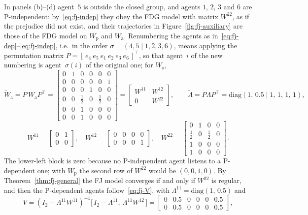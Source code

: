 In panels (b)--(d) agent~$5$ is outside the closed group, and agents $1$, $2$, $3$ and
$6$ are P-independent: by~\eqref{eq:fj-indep} they obey the FDG model with matrix
$W^{22}$, as if the prejudice did not exist, and their trajectories in
Figure~\ref{fig:fj-auxiliary} are those of the FDG model on $W_{\mathrm{p}}$ and
$W_{\mathrm{a}}$. Renumbering the agents as in~\eqref{eq:fj-dep}--\eqref{eq:fj-indep},
i.e.\ in the order $\sigma = (4, 5 \mid 1, 2, 3, 6)$, means applying the permutation
matrix $P = [\, e_4\ e_5\ e_1\ e_2\ e_3\ e_6 \,]^\top$, so that agent~$i$ of the new
numbering is agent~$\sigma(i)$ of the original one; for $W_{\mathrm{a}}$,
\[
  \tilde W_{\mathrm{a}} = P\, W_{\mathrm{a}} P^\top =
  \left[\begin{array}{cc|cccc}
    0 & 1 & 0 & 0 & 0 & 0\\
    0 & 0 & 0 & 0 & 0 & 1\\ \hline
    0 & 0 & 0 & 1 & 0 & 0\\
    0 & 0 & \tfrac12 & 0 & \tfrac12 & 0\\
    0 & 0 & 1 & 0 & 0 & 0\\
    0 & 0 & 1 & 0 & 0 & 0
  \end{array}\right]
  = \begin{bmatrix} W^{11} & W^{12} \\ 0 & W^{22} \end{bmatrix},
  \qquad
  \tilde\Lambda = P \Lambda P^\top = \mathrm{diag}(1,\, 0.5 \mid 1,\, 1,\, 1,\, 1),
\]
\[
  W^{11} = \begin{bmatrix} 0&1\\ 0&0 \end{bmatrix},\quad
  W^{12} = \begin{bmatrix} 0&0&0&0\\ 0&0&0&1 \end{bmatrix},\quad
  W^{22} = \begin{bmatrix} 0&1&0&0\\ \tfrac12&0&\tfrac12&0\\ 1&0&0&0\\ 1&0&0&0 \end{bmatrix}.
\]
The lower-left block is zero because no P-independent agent listens to a P-dependent
one; with $W_{\mathrm{p}}$ the second row of $W^{22}$ would be $(0, 0, 1, 0)$. By
Theorem~\ref{thm:fj-general} the FJ model converges if and only if $W^{22}$ is regular,
and then the P-dependent agents follow~\eqref{eq:fj-V}, with
$\Lambda^{11} = \mathrm{diag}(1,\, 0.5)$ and
\[
  V = (I_2 - \Lambda^{11} W^{11})^{-1}
      \big[\, I_2 - \Lambda^{11},\ \Lambda^{11} W^{12} \,\big]
  = \left[\begin{array}{cc|cccc}
      0 & 0.5 & 0 & 0 & 0 & 0.5\\ 0 & 0.5 & 0 & 0 & 0 & 0.5
    \end{array}\right],
\]
